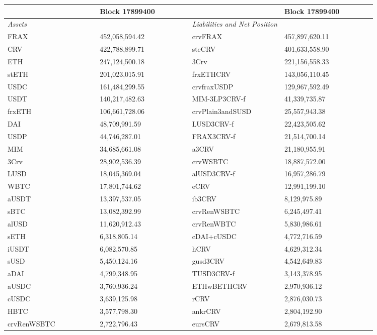 
\begin{longtable}{@{}p{0.25\linewidth}p{0.25\linewidth}p{0.25\linewidth}p{0.25\linewidth}@{}}

\toprule


& Block 17899400 & & Block 17899400 \\

\midrule
\textit{Assets} & & \textit{Liabilities and Net Position} \\
FRAX & 452,058,594.42 & crvFRAX &457,897,620.11 \\
CRV & 422,788,899.71 & steCRV &401,633,558.90 \\
ETH & 247,124,500.18 & 3Crv &221,156,558.33 \\
stETH & 201,023,015.91 & frxETHCRV &143,056,110.45 \\
USDC & 161,484,299.55 & crvfraxUSDP &129,967,592.49 \\
USDT & 140,217,482.63 & MIM-3LP3CRV-f &41,339,735.87 \\
frxETH & 106,661,728.06 & crvPlain3andSUSD &25,557,943.38 \\
DAI & 48,709,991.59 & LUSD3CRV-f &22,423,505.62 \\
USDP & 44,746,287.01 & FRAX3CRV-f &21,514,700.14 \\
MIM & 34,685,661.08 & a3CRV &21,180,955.91 \\
3Crv & 28,902,536.39 & crvWSBTC &18,887,572.00 \\
LUSD & 18,045,369.04 & alUSD3CRV-f &16,957,286.79 \\
WBTC & 17,801,744.62 & eCRV &12,991,199.10 \\
aUSDT & 13,397,537.05 & ib3CRV &8,129,975.89 \\
sBTC & 13,082,392.99 & crvRenWSBTC &6,245,497.41 \\
alUSD & 11,620,912.43 & crvRenWBTC &5,830,986.61 \\
sETH & 6,318,805.14 & cDAI+cUSDC &4,772,716.59 \\
iUSDT & 6,082,570.85 & hCRV &4,629,312.34 \\
sUSD & 5,450,124.16 & gusd3CRV &4,542,649.83 \\
aDAI & 4,799,348.95 & TUSD3CRV-f &3,143,378.95 \\
aUSDC & 3,760,936.24 & ETHwBETHCRV &2,970,936.12 \\
cUSDC & 3,639,125.98 & rCRV &2,876,030.73 \\
HBTC & 3,577,798.30 & ankrCRV &2,804,192.90 \\
crvRenWSBTC & 2,722,796.43 & eursCRV &2,679,813.58 \\

\end{longtable}
